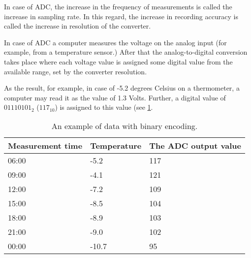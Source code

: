 \documentclass[../sparc.tex]{subfiles}
\begin{document}
In case of ADC, the increase in the frequency of measurements is called the
increase in sampling rate.  In this regard, the increase in recording accuracy
is called the increase in resolution of the converter.

In case of ADC a computer measures the voltage on the analog input (for example,
from a temperature sensor.)  After that the analog-to-digital conversion takes
place where each voltage value is assigned some digital value from the available
range, set by the converter resolution.

As the result, for example, in case of -5.2 degrees Celsius on a thermometer, a
computer may read it as the value of 1.3 Volts.  Further, a digital value of
$01110101_2$ ($117_{10}$) is assigned to this value (see
\ref{table:adc-temperature-data-example-4}.

\begin{table}[h]
  \centering
  \begin{tabular}{p{3cm}|p{4cm}|p{4cm}}
    Measurement time & Temperature & The ADC output value \\
    \hline \hline
    06:00 & -5.2  & 117 \\
    \hline
    09:00 & -4.1  & 121 \\
    \hline
    12:00 & -7.2  & 109 \\
    \hline
    15:00 & -8.5  & 104 \\
    \hline
    18:00 & -8.9  & 103 \\
    \hline
    21:00 & -9.0  & 102 \\
    \hline
    00:00 & -10.7 & 95 \\
    \hline
  \end{tabular}
  \caption{An example of data with binary encoding.}
  \label{table:adc-temperature-data-example-4}
\end{table}

\end{document}
